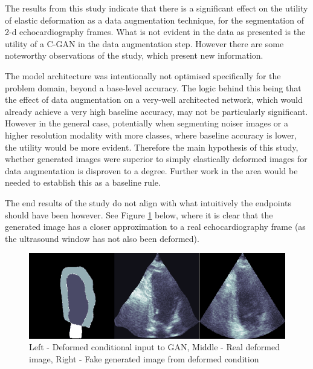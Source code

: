 The results from this study indicate that there is a significant effect on the
utility of elastic deformation as a data augmentation technique, for the
segmentation of 2-d echocardiography frames. What is not evident in the data as
presented is the utility of a C-GAN in the data augmentation step. However there
are some noteworthy observations of the study, which present new information.\newline

The model architecture was intentionally not optimised specifically for the
problem domain, beyond a base-level accuracy. The logic behind this being that
the effect of data augmentation on a very-well architected network, which would
already achieve a very high baseline accuracy, may not be particularly
significant. However in the general case, potentially when segmenting noiser
images or a higher resolution modality with more classes, where baseline
accuracy is lower, the utility would be more evident. Therefore the main
hypothesis of this study, whether generated images were superior to simply
elastically deformed images for data augmentation is disproven to a degree.
Further work in the area would be needed to establish this as a baseline rule.
\newline

The end results of the study do not align with what intuitively the endpoints
should have been however. See Figure \ref{fig:conditional} below, where it is clear that the
generated image has a closer approximation to a real echocardiography frame (as
the ultrasound window has not also been deformed). \newline

\begin{figure}[h]
    \centering
    \includegraphics[width=1.0\textwidth]{figures/conditional.png}
    \caption{Left - Deformed conditional input to GAN, Middle - Real deformed image, Right - Fake generated image from deformed condition}
    \label{fig:conditional}
\end{figure}

